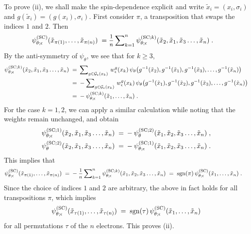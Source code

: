\vspace{.5em}

To prove (ii), we shall make the spin-dependence explicit and write $\tilde x_i = (x_i, \sigma_i)$ and $g(\tilde x_i) = (g(x_i), \sigma_i)$. First consider $\pi$, a transposition that swaps the indices $1$ and $2$. Then
\begin{align*}
    \psiSC_{\theta;\epsilon}(\tilde x_{\pi(1)}, \ldots, \tilde  x_{\pi(n)} )
    \;=&\;
    \mfrac{1}{n} \msum_{k=1}^n
    \psiSCk_{\theta;\epsilon}(\tilde  x_2, \tilde x_1, \tilde  x_3 \ldots, \tilde x_n )
    \;.
\end{align*}
By the anti-symmetry of $\psi_\theta$, we see that for $k \geq 3$,
\begin{align*}
    \psiSCk_{\theta;\epsilon}(\tilde x_2, \tilde x_1, \tilde x_3 \ldots, \tilde x_n )
    \;=&\;
    \msum_{g \in \cG_\epsilon(x_k)} 
    \, 
    w^g_\epsilon ( x_k)
    \, 
    \psi_\theta \big( g^{-1}(\tilde x_2), g^{-1}(\tilde x_1), g^{-1}(\tilde x_3), \ldots, g^{-1}(\tilde x_n) \big)
    \\
    \;=&\;
    -
    \msum_{g \in \cG_\epsilon(x_k)} 
    \, 
    w^g_\epsilon (x_k)
    \, 
    \psi_\theta \big( g^{-1}(\tilde x_1), g^{-1}(\tilde x_2), g^{-1}(\tilde x_3), \ldots, g^{-1}(\tilde x_n) \big)
    \\
    \;=&\;
    -
    \psiSCk_{\theta;\epsilon}(\tilde x_1, \ldots, \tilde x_n )
    \;.
\end{align*}
For the case $k=1,2$, we can apply a similar calculation while noting that the weights remain unchanged, and obtain
\begin{align*}
    \psi^{({\rm SC};1)}_{\theta;\epsilon}(\tilde x_2, \tilde x_1, \tilde x_3 \ldots, \tilde x_n )
    \;=&\;
    - \psi^{({\rm SC};2)}_\theta(\tilde x_1, \tilde x_2, \tilde x_3 \ldots, \tilde  x_n ) 
    \;,
    \\
    \psi^{({\rm SC};2)}_\theta(\tilde x_2, \tilde x_1, \tilde x_3 \ldots, \tilde x_n ) 
    \;=&\;
    - \psi^{({\rm SC};1)}_{\theta;\epsilon}(\tilde x_1, \tilde x_2, \tilde x_3 \ldots, \tilde x_n ) 
    \;.
\end{align*}
This implies that 
\begin{align*}
    \psiSC_{\theta;\epsilon}(\tilde x_{\pi(1)}, \ldots, \tilde x_{\pi(n)} )
    \;=&\;
    -
    \mfrac{1}{n} \msum_{k=1}^n
    \psiSCk_{\theta;\epsilon}(\tilde x_1, \tilde x_2, \tilde x_3 \ldots, \tilde  x_n )
    \;=\;
    {\rm sgn}(\pi)
    \,
    \psiSC_{\theta;\epsilon}(\tilde x_1,  \ldots, \tilde x_n )
    \;.
\end{align*}
Since the choice of indices $1$ and $2$ are arbitrary, the above in fact holds for all transpositions $\pi$, which implies 
\begin{align*}
    \psi^{(\rm SC)}_{\theta;\epsilon}(\tilde x_{\tau(1)}, \ldots,\tilde  x_{\tau(n)} )
    \;=\;
    {\rm sgn}(\tau)
    \,
    \psi^{(\rm SC)}_{\theta;\epsilon}(\tilde x_1, \ldots, \tilde x_n )
\end{align*}
for all permutations $\tau$ of the $n$ electrons. This proves (ii).

